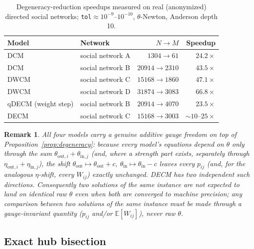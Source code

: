 \documentclass[10pt]{article}
\newtheorem{remark}{Remark}
\begin{document}
\begin{table}[h]
\centering
\small
\begin{tabular}{@{}llrr@{}}
\toprule
Model & Network & $N\to M$ & Speedup \\
\midrule
DCM  & social network A & $1304\to61$    & $24.2\times$ \\
DCM  & social network B & $20914\to2310$ & $43.5\times$ \\
DWCM & social network C & $15168\to1860$ & $47.1\times$ \\
DWCM & social network D & $31874\to3083$ & $66.8\times$ \\
qDECM (weight step) & social network B & $20914\to4070$ & $23.5\times$ \\
DECM & social network C & $15168\to3003$ & $\sim10$--$25\times$ \\
\bottomrule
\end{tabular}
\caption{Degeneracy-reduction speedups measured on real (anonymized)
directed social networks; \texttt{tol}$\approx10^{-9}$--$10^{-10}$,
$\theta$-Newton, Anderson depth 10.}
\label{tab:degeneracy-speedup}
\end{table}

\begin{remark}
All four models carry a genuine additive gauge freedom on top of
Proposition~\ref{prop:degeneracy}: because every model's equations depend
on $\theta$ only through the sum $\theta_{\mathrm{out},i}+\theta_{\mathrm{in},j}$
(and, where a strength part exists, separately through
$\eta_{\mathrm{out},i}+\eta_{\mathrm{in},j}$), the shift
$\theta_{\mathrm{out}}\mapsto\theta_{\mathrm{out}}+c,\ \theta_{\mathrm{in}}\mapsto\theta_{\mathrm{in}}-c$
leaves every $p_{ij}$ (and, for the analogous $\eta$-shift, every
$W_{ij}$) exactly unchanged. DECM has two independent such directions.
Consequently two solutions of the same instance are not expected to
land on identical raw $\theta$ even when both are converged to machine
precision; any comparison between two solutions of the same instance must
be made through a gauge-invariant quantity ($p_{ij}$ and/or $\mathbb
E[W_{ij}]$), never raw $\theta$.
\end{remark}

\subsection{Exact hub bisection}
\label{sec:hub}
\end{document}
